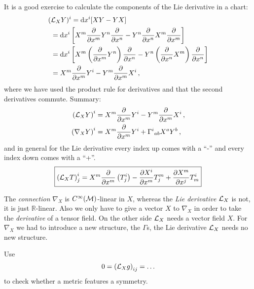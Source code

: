 \documentclass[11pt, a4paper, twocolumn]{article} %
\begin{document}
    It is a good exercise to calculate the components of the Lie derivative in a chart:
    \begin{align*}
        (&\mathcal{L}_X Y)^i = \operatorname{d\!} x^i [XY - YX] \\
        &= \operatorname{d\!} x^i \left[ X^m \frac{\partial}{\partial x^m}Y^n \frac{\partial}{\partial x^n}
        - Y^n\frac{\partial}{\partial x^n} X^m \frac{\partial}{\partial x^m}\right]\\
        &= \operatorname{d\!} x^i \left[ X^m \left( \frac{\partial}{\partial x^m} Y^n \right) \frac{\partial}{\partial x^n}
        - Y^n \left( \frac{\partial}{\partial x^n} X^m \right)\frac{\partial}{\partial x^n}\right]\\
        &= X^m\frac{\partial}{\partial x^m}Y^i - Y^m \frac{\partial}{\partial x^m}X^i\,,
    \end{align*}
    where we have used the product rule for derivatives and that the second derivatives commute.
    Summary:
    \begin{align}
        \left( \mathcal{L}_X Y \right)^i &= X^m\frac{\partial}{\partial x^m}Y^i - Y^m \frac{\partial}{\partial x^m}X^i\,,\\
        \left( \nabla_X Y \right)^i &= X^m\frac{\partial}{\partial x^m}Y^i + \Gamma^i{}_{ab}X^a Y^b\,,
    \end{align}
    and in general for the Lie derivative every index up comes with a ``-'' and every index down
    comes with a ``+''.
    \begin{equation}
        \boxed{%
         \left( \Lie_X T \right)^i_j = X^m \frac{\partial}{\partial x^m}\left( T^i_j \right) -
        \frac{\partial X^i}{\partial x^m}T^m_j
        + \frac{\partial X^m}{\partial x^j}T^i_m
    }
    \end{equation}
    \begin{note}
        The \textit{connection} $\nabla_X$ is $C^\infty(\mathcal{M})$-linear in $X$,
        whereas the \textit{Lie derivative} $\mathcal{L}_X$ is not, it is just $\mathbb{R}$-linear.
        Also we only have to give a vector $X$ to $\nabla_X$ in order to take the \textit{derivative}
        of a tensor field.
        On the other side $\mathcal{L}_X$ needs a vector field $X$.
        For $\nabla_X$ we had to introduce a new structure, the $\Gamma$s, the Lie derivative $\mathcal{L}_X$
        needs no new structure.
    \end{note}
    \begin{note}
        Use
        \begin{equation}
            0 = \left( \mathcal{L}_X g \right)_{ij} = \ldots
        \end{equation}
        to check whether a metric features a symmetry.
    \end{note}
\end{document}
